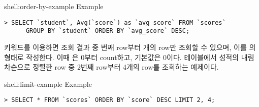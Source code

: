 \begin{shellenv}{shell:order-by-example}{ Example}\begin{verbatim}
> SELECT `student`, Avg(`score`) as `avg_score` FROM `scores`
      GROUP BY `student` ORDER BY `avg_score` DESC;
\end{verbatim}
\end{shellenv}

 키워드를 이용하면 조회 결과 중 번째 row부터 개의 row만 조회할 수 있으며, 이를 의 형태로 작성한다. 이때 은 0부터 count하고, 기본값은 0이다. \은  테이블에서 성적의 내림차순으로 정렬한 row 중 2번째 row부터 4개의 row를 조회하는 예제이다.

\begin{shellenv}{shell:limit-example}{ Example}\begin{verbatim}
> SELECT * FROM `scores` ORDER BY `score` DESC LIMIT 2, 4;
\end{verbatim}
\end{shellenv}
